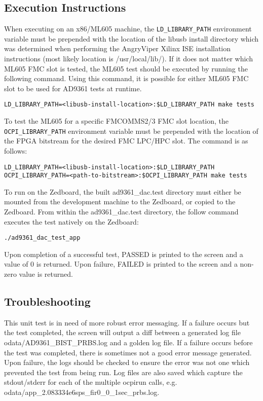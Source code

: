 \documentclass{article}
\def\comp{ad9361\_dac}
\begin{document}
\subsection*{Execution Instructions}
When executing on an x86/ML605 machine, the \texttt{LD\_LIBRARY\_PATH} environment variable must be prepended with the location of the libusb install directory which was determined when performing the AngryViper Xilinx ISE installation instructions\cite{vendor_tools_install} (most likely location is /usr/local/lib/). If it does not matter which ML605 FMC slot is tested, the ML605 test should be executed by running the following command. Using this command, it is possible for either ML605 FMC slot to be used for AD9361 tests at runtime.
\begin{lstlisting}
LD_LIBRARY_PATH=<libusb-install-location>:$LD_LIBRARY_PATH make tests
\end{lstlisting}
To test the ML605 for a specific FMCOMMS2/3 FMC slot location, the \texttt{OCPI\_LIBRARY\_PATH} environment variable must be prepended with the location of the FPGA bitstream for the desired FMC LPC/HPC slot. The command is as follows:
\begin{lstlisting}
LD_LIBRARY_PATH=<libusb-install-location>:$LD_LIBRARY_PATH OCPI_LIBRARY_PATH=<path-to-bitstream>:$OCPI_LIBRARY_PATH make tests
\end{lstlisting}
To run on the Zedboard, the built \comp{}.test directory must either be mounted from the development machine to the Zedboard, or copied to the Zedboard. From within the \comp{}.test directory, the follow command executes the test natively on the Zedboard:
\begin{lstlisting}
./ad9361_dac_test_app
\end{lstlisting}
Upon completion of a successful test, PASSED is printed to the screen and a value of 0 is returned. Upon failure, FAILED is printed to the screen and a non-zero value is returned.
\subsection*{Troubleshooting}
This unit test is in need of more robust error messaging. If a failure occurs but the test completed, the screen will output a diff between a generated log file odata/AD9361\_BIST\_PRBS.log and a golden log file. If a failure occurs before the test was completed, there is sometimes not a good error message generated. Upon failure, the logs should be checked to ensure the error was not one which prevented the test from being run. Log files are also saved which capture the stdout/stderr for each of the multiple ocpirun calls, e.g. odata/app\_2.083334e6sps\_fir0\_0\_1sec\_prbs.log.
\end{document}
